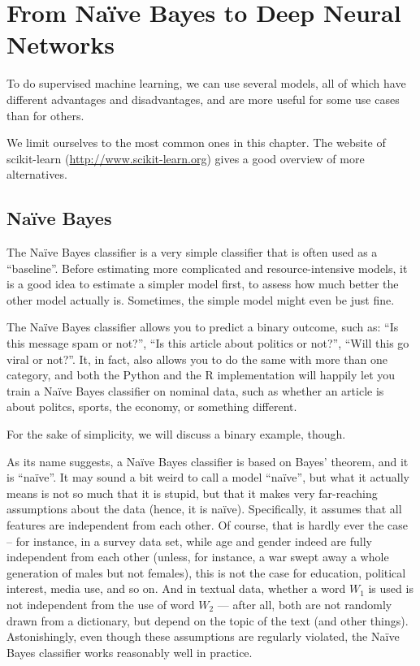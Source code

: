 \section{From Na\"{i}ve Bayes to Deep Neural Networks}
\label{sec:nb2dnn}
To do supervised machine learning, we can use several models, all of
which have different advantages and disadvantages, and are more useful
for some use cases than for others.

We limit ourselves to the most common ones in this chapter. The
website of scikit-learn (\url{http://www.scikit-learn.org}) gives a
good overview of more alternatives.

\subsection{Na\"ive Bayes}
\label{subsec:Na\"ive Bayes}

The Na\"ive Bayes classifier is a very simple classifier that is often
used as a ``baseline''. Before estimating more complicated and
resource-intensive models, it is a good idea to estimate a simpler
model first, to assess how much better the other model actually
is. Sometimes, the simple model might even be just fine.

The Na\"ive Bayes classifier allows you to predict a binary outcome,
such as: ``Is this message spam or not?'', ``Is this article about
politics or not?'', ``Will this go viral or not?''.  It, in fact, also
allows you to do the same with more than one category, and both the
Python and the R implementation will happily let you train a Na\"ive
Bayes classifier on nominal data, such as whether an article is about
politcs, sports, the economy, or something different.

For the sake of simplicity, we will discuss a binary example, though.

As its name suggests, a Na\"ive Bayes classifier is based on Bayes'
theorem, and it is ``na\"ive''.  It may sound a bit weird to call a
model ``na\"ive'', but what it actually means is not so much that it
is stupid, but that it makes very far-reaching assumptions about the
data (hence, it is na\"ive). Specifically, it assumes that all
features are independent from each other.  Of course, that is hardly
ever the case -- for instance, in a survey data set, while age and
gender indeed are fully independent from each other (unless, for
instance, a war swept away a whole generation of males but not
females), this is not the case for education, political interest,
media use, and so on.  And in textual data, whether a word $W_1$ is used
is not independent from the use of word $W_2$ --- after all, both are not
randomly drawn from a dictionary, but depend on the topic of the text
(and other things).  Astonishingly, even though these assumptions are
regularly violated, the Na\"ive Bayes classifier works reasonably well
in practice.

